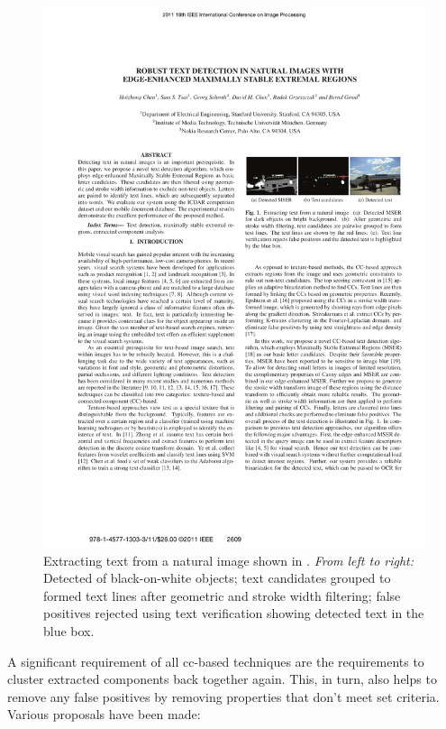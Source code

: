 \begin{figure}[tbh]
  \centering
  \includegraphics[width=\textwidth]{images/background/chen2011_mser}
  \caption[Using contrast-enhanced MSERs to detect text]{Extracting text from a natural image shown in \citet{Chen:2011ul}. \textit{From left to right:} Detected  of black-on-white objects; text candidates grouped to formed text lines after geometric and stroke width filtering; false positives rejected using text verification showing detected text in the blue box.}
  \label{fig:background:detection:cc:chen2011_mser}
\end{figure}

A significant requirement of all \gls{cc}-based techniques are the requirements to cluster extracted components back together again. This, in turn, also helps to remove any false positives by removing properties that don't meet set criteria. Various proposals have been made:

